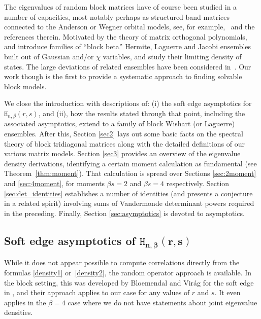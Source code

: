 \documentclass[pdftex]{sigma}
\numberwithin{equation}{section}
\theoremstyle{definition}
\newcommand{\HH}{\mathtt{H}_{n,\beta}}
\begin{document}
The eigenvalues of random block matrices have of course been studied in a number of capacities, most notably perhaps as structured band matrices connected to the Anderson or Wegner orbital models, see, for example,~\cite{SchSch}
and the references therein. Motivated by the theory of matrix orthogonal polynomials,
\cite{Dette1} and \cite{Dette2} introduce families of ``block beta'' Hermite, Laguerre and Jacobi ensembles built out of Gaussian and/or $\chi$ variables, and study their limiting density of states.
The large deviations of related ensembles have been considered in~\cite{Rouault1,Rouault2}.
Our work though is the first to provide a systematic approach to finding solvable block models.

We close the introduction with descriptions of: (i) the soft edge asymptotics for $\HH(r,s)$, and (ii), how the results stated through that point, including the associated asymptotics, extend to a family of block Wishart (or Laguerre) ensembles. After this, Section \ref{sec2} lays out some basic facts on the spectral theory of block tridiagonal matrices along with the detailed definitions of our various matrix models. Section \ref{sec3} provides an overview of the eigenvalue density derivations, identifying a certain moment calculation as fundamental (see Theorem~\ref{thm:moment}). That calculation is spread over Sections \ref{sec:2moment} and \ref{sec:4moment}, for moments $\beta s =2$ and $\beta s = 4$ respectively. Section \ref{sec:det_identities} establishes a number of identities (and presents a conjecture in a related spirit) involving
sums of Vandermonde determinant powers required in the preceding. Finally,
 Section \ref{sec:asymptotics} is devoted to asymptotics.

\subsection[Soft edge asymptotics of HH(r,s)]{Soft edge asymptotics of $\boldsymbol{\HH(r,s)}$}

While it does not appear possible to compute correlations directly from the formulas \eqref{density1} or~\eqref{density2}, the random operator approach is available. In the block setting, this was developed by Bloemendal and Vir\'ag for the soft edge in \cite{Spike2}, and their approach applies to our case for any values of $r$ and $s$. It even applies in the $\beta=4$ case where we do not have statements about joint eigenvalue densities.
\end{document}

